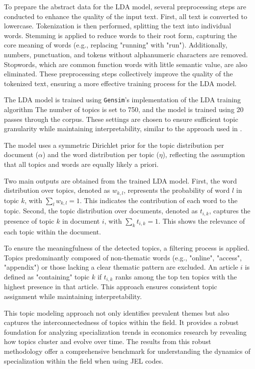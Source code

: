 \documentclass[11pt, a4paper, leqno]{article}
\begin{document}
To prepare the abstract data for the LDA model, several preprocessing steps are conducted to enhance the quality of the input text.
First, all text is converted to lowercase.
Tokenization is then performed, splitting the text into individual words.
Stemming is applied to reduce words to their root form, capturing the core meaning of words (e.g., replacing "running" with "run").
Additionally, numbers, punctuation, and tokens without alphanumeric characters are removed.
Stopwords, which are common function words with little semantic value, are also eliminated.
These preprocessing steps collectively improve the quality of the tokenized text, ensuring a more effective training process for the LDA model.

The LDA model is trained using \texttt{Gensim}'s implementation of the LDA training algorithm
The number of topics is set to 750, and the model is trained using 20 passes through the corpus.
These settings are chosen to ensure sufficient topic granularity while maintaining interpretability, similar to the approach used in \cite{galiani2023a}.

The model uses a symmetric Dirichlet prior for the topic distribution per document ($\alpha$) and the word distribution per topic ($\eta$), reflecting the assumption that all topics and words are equally likely a priori.

Two main outputs are obtained from the trained LDA model. First, the word distribution over topics, denoted as $w_{k,l}$, represents the probability of word $l$ in topic $k$, with $\sum_l w_{k,l} = 1$.
This indicates the contribution of each word to the topic.
Second, the topic distribution over documents, denoted as $t_{i,k}$, captures the presence of topic $k$ in document $i$, with $\sum_k t_{i,k} = 1$.
This shows the relevance of each topic within the document.

To ensure the meaningfulness of the detected topics, a filtering process is applied.
Topics predominantly composed of non-thematic words (e.g., "online", "access", "appendix") or those lacking a clear thematic pattern are excluded.
An article $i$ is defined as "containing" topic $k$ if $t_{i,k}$ ranks among the top ten topics with the highest presence in that article.
This approach ensures consistent topic assignment while maintaining interpretability.

This topic modeling approach not only identifies prevalent themes but also captures the interconnectedness of topics within the field.
It provides a robust foundation for analyzing specialization trends in economics research by revealing how topics cluster and evolve over time.
The results from this robust methodology offer a comprehensive benchmark for understanding the dynamics of specialization within the field when using JEL codes.
\end{document}
